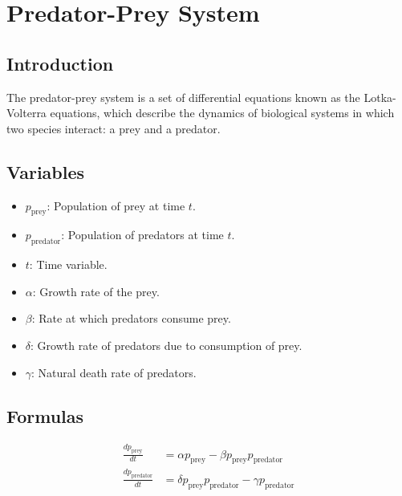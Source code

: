 \section{Predator-Prey System}

\subsection{Introduction}

The predator-prey system is a set of differential equations known as the Lotka-Volterra equations, which describe the dynamics of biological systems in which two species interact: a prey and a predator.

\subsection{Variables}

\begin{itemize}
    \item $p_{\text{prey}}$: Population of prey at time $t$.
    \item $p_{\text{predator}}$: Population of predators at time $t$.
    \item $t$: Time variable.
    \item $\alpha$: Growth rate of the prey.
    \item $\beta$: Rate at which predators consume prey.
    \item $\delta$: Growth rate of predators due to consumption of prey.
    \item $\gamma$: Natural death rate of predators.
\end{itemize}

\subsection{Formulas}

\begin{align*}
    \frac{dp_{\text{prey}}}{dt} &= \alpha p_{\text{prey}} - \beta p_{\text{prey}} p_{\text{predator}} \\
    \frac{dp_{\text{predator}}}{dt} &= \delta p_{\text{prey}} p_{\text{predator}} - \gamma p_{\text{predator}}
\end{align*}